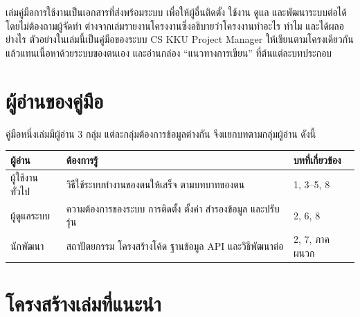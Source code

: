 เล่มคู่มือการใช้งานเป็นเอกสารที่ส่งพร้อมระบบ เพื่อให้ผู้อื่นติดตั้ง ใช้งาน ดูแล และพัฒนาระบบต่อได้
โดยไม่ต้องถามผู้จัดทำ ต่างจากเล่มรายงานโครงงานซึ่งอธิบายว่าโครงงานทำอะไร ทำไม และได้ผลอย่างไร
ตัวอย่างในเล่มนี้เป็นคู่มือของระบบ CS KKU Project Manager
ให้เขียนตามโครงเดียวกันแล้วแทนเนื้อหาด้วยระบบของตนเอง
และอ่านกล่อง ``แนวทางการเขียน'' ที่ต้นแต่ละบทประกอบ

\section*{ผู้อ่านของคู่มือ}

คู่มือหนึ่งเล่มมีผู้อ่าน 3 กลุ่ม แต่ละกลุ่มต้องการข้อมูลต่างกัน จึงแยกบทตามกลุ่มผู้อ่าน ดังนี้

\begin{center}
\begin{tabular}{|L{3.3cm}|L{\dimexpr\linewidth-6.3cm-6\arrayrulewidth\relax}|L{3cm}|}
\hline
\textbf{ผู้อ่าน} & \textbf{ต้องการรู้} & \textbf{บทที่เกี่ยวข้อง} \\ \hline
ผู้ใช้งานทั่วไป & วิธีใช้ระบบทำงานของตนให้เสร็จ ตามบทบาทของตน & 1, 3--5, 8 \\ \hline
ผู้ดูแลระบบ & ความต้องการของระบบ การติดตั้ง ตั้งค่า สำรองข้อมูล และปรับรุ่น & 2, 6, 8 \\ \hline
นักพัฒนา & สถาปัตยกรรม โครงสร้างโค้ด ฐานข้อมูล API และวิธีพัฒนาต่อ & 2, 7, ภาคผนวก \\ \hline
\end{tabular}
\end{center}

\section*{โครงสร้างเล่มที่แนะนำ}

